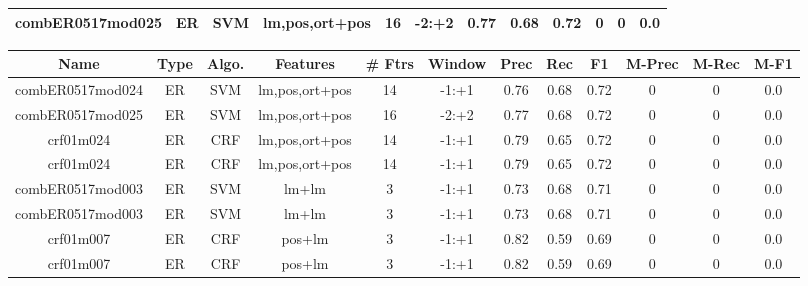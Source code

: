 \documentclass[a4paper]{article}
\begin{document}
\begin{landscape}
\begin{center}
\begin{tabular}{ |c|c|c|c|c|c|c|c|c|c|c|c|}
 
 	
 	\small{ combER0517mod025 } & ER & SVM & lm,pos,ort+pos  &  16 &  -2:+2  &  0.77 & 0.68 & 0.72  &  0 & 0 & 0.0 \\
 	
 \hline
\end{tabular}
\end{center}




\begin{center}
\begin{tabular}{ |c|c|c|c|c|c|c|c|c|c|c|c|} 
 \hline
 	Name & Type & Algo. & Features & \# Ftrs & Window & Prec & Rec & F1 & M-Prec & M-Rec & M-F1\\
 \hline

 	

 
 	
 	\small{ combER0517mod024 } & ER & SVM & lm,pos,ort+pos  &  14 &  -1:+1  &  0.76 & 0.68 & 0.72  &  0 & 0 & 0.0 \\
 	

 
 	
 	\small{ combER0517mod025 } & ER & SVM & lm,pos,ort+pos  &  16 &  -2:+2  &  0.77 & 0.68 & 0.72  &  0 & 0 & 0.0 \\
 	

 
 	
 	\small{ crf01m024 } & ER & CRF & lm,pos,ort+pos  &  14 &  -1:+1  &  0.79 & 0.65 & 0.72  &  0 & 0 & 0.0 \\
 	

 
 	
 	\small{ crf01m024 } & ER & CRF & lm,pos,ort+pos  &  14 &  -1:+1  &  0.79 & 0.65 & 0.72  &  0 & 0 & 0.0 \\
 	

 
 	
 	\small{ combER0517mod003 } & ER & SVM & lm+lm  &  3 &  -1:+1  &  0.73 & 0.68 & 0.71  &  0 & 0 & 0.0 \\
 	

 
 	
 	\small{ combER0517mod003 } & ER & SVM & lm+lm  &  3 &  -1:+1  &  0.73 & 0.68 & 0.71  &  0 & 0 & 0.0 \\
 	

 
 	
 	\small{ crf01m007 } & ER & CRF & pos+lm  &  3 &  -1:+1  &  0.82 & 0.59 & 0.69  &  0 & 0 & 0.0 \\
 	

 
 	
 	\small{ crf01m007 } & ER & CRF & pos+lm  &  3 &  -1:+1  &  0.82 & 0.59 & 0.69  &  0 & 0 & 0.0 \\
 	


\end{tabular}
\end{center}
\end{landscape}
\end{document}
